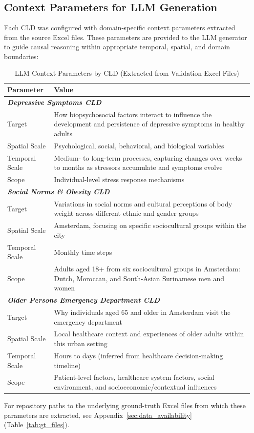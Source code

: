 \subsection{Context Parameters for LLM Generation}

Each CLD was configured with domain-specific context parameters extracted from the source Excel files. These parameters are provided to the LLM generator to guide causal reasoning within appropriate temporal, spatial, and domain boundaries:

\begin{table}[H]
\centering
\caption{LLM Context Parameters by CLD (Extracted from Validation Excel Files)}
\label{tab:cld_context}
\footnotesize
\begin{tabularx}{\textwidth}{@{}l X@{}}
\toprule
\textbf{Parameter} & \textbf{Value} \\
\midrule
\multicolumn{2}{l}{\textit{\textbf{Depressive Symptoms CLD}}} \\
Target & How biopsychosocial factors interact to influence the development and persistence of depressive symptoms in healthy adults \\
Spatial Scale & Psychological, social, behavioral, and biological variables \\
Temporal Scale & Medium- to long-term processes, capturing changes over weeks to months as stressors accumulate and symptoms evolve \\
Scope & Individual-level stress response mechanisms \\
\midrule
\multicolumn{2}{l}{\textit{\textbf{Social Norms \& Obesity CLD}}} \\
Target & Variations in social norms and cultural perceptions of body weight across different ethnic and gender groups \\
Spatial Scale & Amsterdam, focusing on specific sociocultural groups within the city \\
Temporal Scale & Monthly time steps \\
Scope & Adults aged 18+ from six sociocultural groups in Amsterdam: Dutch, Moroccan, and South-Asian Surinamese men and women \\
\midrule
\multicolumn{2}{l}{\textit{\textbf{Older Persons Emergency Department CLD}}} \\
Target & Why individuals aged 65 and older in Amsterdam visit the emergency department \\
Spatial Scale & Local healthcare context and experiences of older adults within this urban setting \\
Temporal Scale & Hours to days (inferred from healthcare decision-making timeline) \\
Scope & Patient-level factors, healthcare system factors, social environment, and socioeconomic/contextual influences \\
\bottomrule
\end{tabularx}
\end{table}
For repository paths to the underlying ground-truth Excel files from which these parameters are extracted, see Appendix~\ref{sec:data_availability} (Table~\ref{tab:gt_files}).

